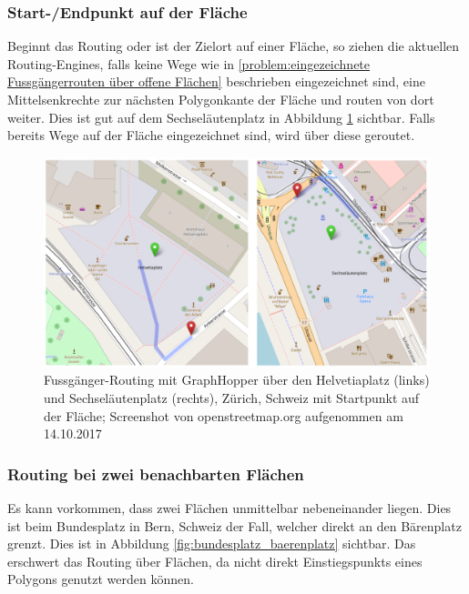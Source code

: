\subsubsection{Start-/Endpunkt auf der Fläche}
\label{problem:Start-/Endpunkt auf der Fläche}
Beginnt das Routing oder ist der Zielort auf einer Fläche, so ziehen die aktuellen \glspl{Routing-Engine}, falls keine Wege wie in \ref{problem:eingezeichnete Fussgängerrouten über offene Flächen} beschrieben eingezeichnet sind, eine Mittelsenkrechte zur nächsten Polygonkante der Fläche und routen von dort weiter. Dies ist gut auf dem Sechseläutenplatz in Abbildung \ref{fig:start_endpoint_on_area} sichtbar. Falls bereits Wege auf der Fläche eingezeichnet sind, wird über diese geroutet.

\begin{figure}[ht]
    \centering
    \includegraphics[width=1\linewidth]{technicalreport/img/start_endpoint_on_area}
    \caption[Fussgänger-Routing mit Startpunkt auf der Fläche]{Fussgänger-Routing mit GraphHopper über den Helvetiaplatz (links) und Sechseläutenplatz (rechts), Zürich, Schweiz mit Startpunkt auf der Fläche; Screenshot von openstreetmap.org aufgenommen am 14.10.2017}
    \label{fig:start_endpoint_on_area}
\end{figure}

\subsubsection{Routing bei zwei benachbarten Flächen}
\label{problem:Routing bei zwei benachbarten Flächen}
Es kann vorkommen, dass zwei Flächen unmittelbar nebeneinander liegen. Dies ist beim Bundesplatz in Bern, Schweiz der Fall, welcher direkt an den Bärenplatz grenzt. Dies ist in Abbildung \ref{fig:bundesplatz_baerenplatz} sichtbar. Das erschwert das Routing über Flächen, da nicht direkt \glspl{Einstiegspunkt} eines Polygons genutzt werden können.

